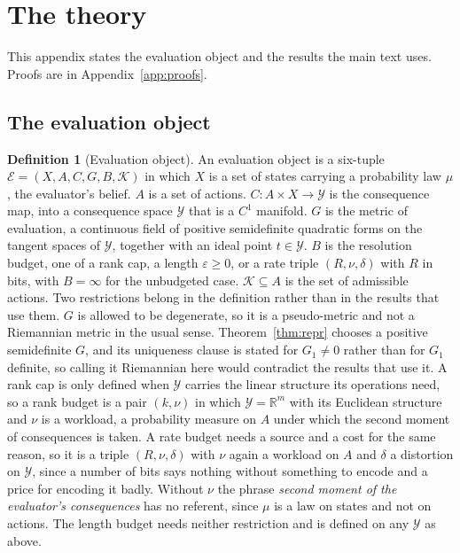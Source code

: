 \documentclass{article}
\theoremstyle{definition}
\newtheorem{definition}{Definition}
\theoremstyle{remark}
\newcommand{\Ev}{\mathcal{E}}
\newcommand{\K}{\mathcal{K}}
\newcommand{\Y}{\mathcal{Y}}
\newcommand{\R}{\mathbb{R}}
\begin{document}
\section{The theory}
\label{app:theory}

This appendix states the evaluation object and the results the main text uses. Proofs are in Appendix~\ref{app:proofs}.

\subsection{The evaluation object}
\label{sec:object}

\begin{definition}[Evaluation object]
\label{def:object}
An evaluation object is a six-tuple $\Ev=(X,A,C,G,B,\K)$ in which $X$ is a set of states carrying a probability law $\mu$, the evaluator's belief. $A$ is a set of actions. $C:A\times X\to\Y$ is the consequence map, into a consequence space $\Y$ that is a $C^{1}$ manifold. $G$ is the metric of evaluation, a continuous field of positive semidefinite quadratic forms on the tangent spaces of $\Y$, together with an ideal point $t\in\Y$. $B$ is the resolution budget, one of a rank cap, a length $\varepsilon\ge0$, or a rate triple $(R,\nu,\delta)$ with $R$ in bits, with $B=\infty$ for the unbudgeted case. $\K\subseteq A$ is the set of admissible actions.
Two restrictions belong in the definition rather than in the results that use them.
$G$ is allowed to be degenerate, so it is a pseudo-metric and not a Riemannian metric in the usual sense. Theorem~\ref{thm:repr} chooses a positive semidefinite $G$, and its uniqueness clause is stated for $G_{1}\neq0$ rather than for $G_{1}$ definite, so calling it Riemannian here would contradict the results that use it.
A rank cap is only defined when $\Y$ carries the linear structure its operations need, so a rank budget is a pair $(k,\nu)$ in which $\Y=\R^{m}$ with its Euclidean structure and $\nu$ is a workload, a probability measure on $A$ under which the second moment of consequences is taken.
A rate budget needs a source and a cost for the same reason, so it is a triple $(R,\nu,\delta)$ with $\nu$ again a workload on $A$ and $\delta$ a distortion on $\Y$, since a number of bits says nothing without something to encode and a price for encoding it badly.
Without $\nu$ the phrase \emph{second moment of the evaluator's consequences} has no referent, since $\mu$ is a law on states and not on actions.
The length budget needs neither restriction and is defined on any $\Y$ as above.
\end{definition}
\end{document}
